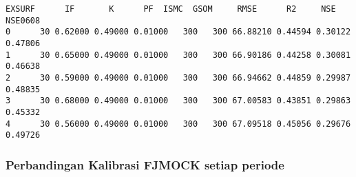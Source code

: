 \documentclass[11pt]{article}
\makeatletter
\newcommand{\boxspacing}{\kern\kvtcb@left@rule\kern\kvtcb@boxsep}
\newcommand{\prompt}[4]{
        {\ttfamily\llap{{\color{#2}[#3]:\hspace{3pt}#4}}\vspace{-\baselineskip}}
    }
\makeatother
\begin{document}
            \begin{tcolorbox}[breakable, size=fbox, boxrule=.5pt, pad at break*=1mm, opacityfill=0]
\prompt{Out}{outcolor}{ }{\boxspacing}
\begin{Verbatim}[commandchars=\\\{\}]
   EXSURF      IF       K      PF  ISMC  GSOM     RMSE      R2     NSE  NSE0608
0      30 0.62000 0.49000 0.01000   300   300 66.88210 0.44594 0.30122  0.47806
1      30 0.65000 0.49000 0.01000   300   300 66.90186 0.44258 0.30081  0.46638
2      30 0.59000 0.49000 0.01000   300   300 66.94662 0.44859 0.29987  0.48835
3      30 0.68000 0.49000 0.01000   300   300 67.00583 0.43851 0.29863  0.45332
4      30 0.56000 0.49000 0.01000   300   300 67.09518 0.45056 0.29676  0.49726
\end{Verbatim}
\end{tcolorbox}
        
    \hypertarget{perbandingan-kalibrasi-fjmock-setiap-periode}{%
\subsubsection{Perbandingan Kalibrasi FJMOCK setiap
periode}\label{perbandingan-kalibrasi-fjmock-setiap-periode}}
\end{document}
